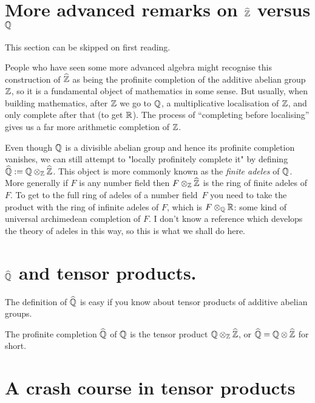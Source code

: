 \section{More advanced remarks on \texorpdfstring{$\widehat{\mathbb{Z}}$}{Zhat} versus \texorpdfstring{$\mathbb{Q}$}{Q}}

This section can be skipped on first reading.

People who have seen some more advanced algebra might recognise this construction of $\widehat{\mathbb{Z}}$
as being the profinite completion of the additive abelian group $\mathbb{Z}$, so it is a fundamental
object of mathematics in some sense. But usually, when building mathematics, after $\mathbb{Z}$ we
go to $\mathbb{Q}$, a multiplicative localisation of $\mathbb{Z}$, and only complete after that (to get $\mathbb{R}$).
The process of ``completing before localising'' gives us a far more arithmetic completion
of $\mathbb{Z}$.

Even though $\mathbb{Q}$ is a divisible abelian group and hence its profinite completion vanishes,
we can still attempt to "locally profinitely complete it" by defining $\widehat{\mathbb{Q}}:=\mathbb{Q}\otimes_{\mathbb{Z}}\widehat{\mathbb{Z}}$.
This object is more commonly known as the \emph{finite adeles} of $\mathbb{Q}$. More generally if $F$ is
any number field then $F\otimes_{\mathbb{Z}}\widehat{\mathbb{Z}}$ is the ring of finite adeles of $F$. To get to
the full ring of adeles of a number field~$F$ you need to take the product with the
ring of infinite adeles of $F$, which is $F\otimes_{\mathbb{Q}}\mathbb{R}$: some kind of universal
archimedean completion of $F$. I don't know a reference which develops the theory of adeles
in this way, so this is what we shall do here.

\section{\texorpdfstring{$\widehat{\mathbb{Q}}$}{Qhat} and tensor products.}

The definition of $\widehat{\mathbb{Q}}$ is easy if you know about tensor products
of additive abelian groups.

\begin{definition}
    \label{QHat}
    \leanok
    The profinite completion $\widehat{\mathbb{Q}}$ of $\mathbb{Q}$ is the tensor product $\mathbb{Q}\otimes_{\mathbb{Z}}\widehat{\mathbb{Z}}$,
    or $\widehat{\mathbb{Q}}=\mathbb{Q}\otimes\widehat{\mathbb{Z}}$ for short.
\end{definition}

\section{A crash course in tensor products}

